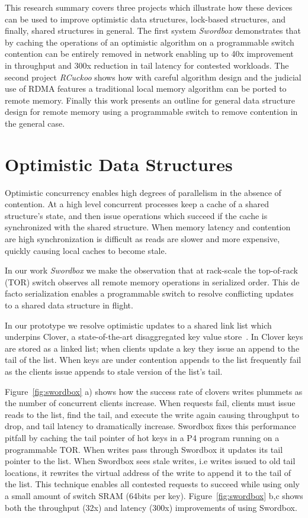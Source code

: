 This research summary covers three projects which illustrate
how these devices can be used to improve optimistic data
structures, lock-based structures, and finally, shared
structures in general.  The first system \textit{Swordbox}
demonstrates that by caching the operations of an optimistic
algorithm on a programmable switch contention can be
entirely removed in network enabling up to 40x improvement
in throughput and 300x reduction in tail latency for
contested workloads. The second project \textit{RCuckoo}
shows how with careful algorithm design and the judicial use
of RDMA features a traditional local memory algorithm can be
ported to remote memory. Finally this work presents an
outline for general data structure design for remote memory
using a programmable switch to remove contention in the
general case.


\section{Optimistic Data Structures}

Optimistic concurrency enables high degrees of parallelism
in the absence of contention. At a high level concurrent
processes keep a cache of a shared structure's state, and
then issue operations which succeed if the cache is
synchronized with the shared structure. When memory latency
and contention are high synchronization is difficult as
reads are slower and more expensive, quickly causing local
caches to become stale.

In our work \textit{Swordbox} we make the observation that
at rack-scale the top-of-rack (TOR) switch observes all
remote memory operations in serialized order. This de facto
serialization enables a programmable switch to resolve
conflicting updates to a shared data structure in flight.

In our prototype we resolve optimistic updates to a shared
link list which underpins Clover, a state-of-the-art
disaggregated key value store~\cite{clover}. In Clover keys
are stored as a linked list; when clients update a key they
issue an append to the tail of the list. When keys are under
contention appends to the list frequently fail as the
clients issue appends to stale version of the list's tail.

Figure~\ref{fig:swordbox} a) shows how the success rate of
clovers writes plummets as the number of concurrent clients
increase. When requests fail, clients must issue reads to
the list, find the tail, and execute the write again causing
throughput to drop, and tail latency to dramatically
increase. Swordbox fixes this performance pitfall by caching
the tail pointer of hot keys in a P4 program running on a
programmable TOR. When writes pass through Swordbox it
updates its tail pointer to the list.  When Swordbox sees
stale writes, i.e writes issued to old tail locations, it
rewrites the virtual address of the write to append it to
the tail of the list. This technique enables all contested
requests to succeed while using only a small amount of
switch SRAM (64bits per key). Figure~\ref{fig:swordbox} b,c
shows both the throughput (32x) and latency (300x)
improvements of using Swordbox.

